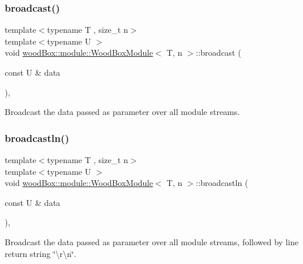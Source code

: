 \subsubsection{\texorpdfstring{broadcast()}{broadcast()}}
{\footnotesize\ttfamily template$<$typename T , size\+\_\+t n$>$ \\
template$<$typename U $>$ \\
void \mbox{\hyperlink{classwood_box_1_1module_1_1_wood_box_module}{wood\+Box\+::module\+::\+Wood\+Box\+Module}}$<$ T, n $>$\+::broadcast (\begin{DoxyParamCaption}\item[{const U \&}]{data }\end{DoxyParamCaption})\hspace{0.3cm}{\ttfamily [inline]}, {\ttfamily [protected]}}

Broadcast the data passed as parameter over all module streams. \mbox{\label{classwood_box_1_1module_1_1_wood_box_module_a5329c737b0a102851782b5d2a6019bc8}} 
\subsubsection{\texorpdfstring{broadcastln()}{broadcastln()}}
{\footnotesize\ttfamily template$<$typename T , size\+\_\+t n$>$ \\
template$<$typename U $>$ \\
void \mbox{\hyperlink{classwood_box_1_1module_1_1_wood_box_module}{wood\+Box\+::module\+::\+Wood\+Box\+Module}}$<$ T, n $>$\+::broadcastln (\begin{DoxyParamCaption}\item[{const U \&}]{data }\end{DoxyParamCaption})\hspace{0.3cm}{\ttfamily [inline]}, {\ttfamily [protected]}}

Broadcast the data passed as parameter over all module streams, followed by line return string \char`\"{}\textbackslash{}r\textbackslash{}n\char`\"{}. \mbox{\label{classwood_box_1_1module_1_1_wood_box_module_a240ad6ff3f905a531fcc62670a26a6fa}} 
